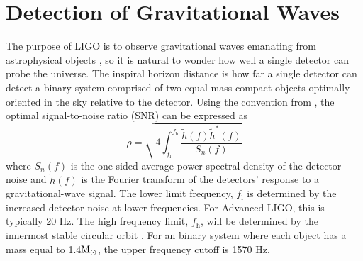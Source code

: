	\section{Detection of Gravitational Waves}\label{detectgw}
	The purpose of LIGO is to observe gravitational waves emanating from astrophysical objects \cite{NSFproposal}, so it is natural to wonder how well a single detector can probe the universe.  The inspiral horizon distance is how far a single detector can detect a binary system comprised of two equal mass compact objects optimally oriented in the sky relative to the detector.  Using the convention from \cite{S6sensitivity}, the optimal signal-to-noise ratio (SNR) can be expressed as
	\begin{equation}\label{SNR}
	\rho = \sqrt{4 \int_{f_{\text{l}}}^{f_\text{h}} \frac{ \tilde{h}(f) \tilde{h}^*(f) }{S_n(f)}}
	\end{equation}
	where ${S_n(f)}$ is the one-sided average power spectral density of the detector noise and $\tilde{h}(f)$ is the Fourier transform of the detectors' response to a gravitational-wave signal.  The lower limit frequency, $f_{\text{l}}$ is determined by the increased detector noise at lower frequencies.  For Advanced LIGO, this is typically 20 Hz.  The high frequency limit, $f_{\text{h}}$, will be determined by the innermost stable circular orbit \cite{Finn:1995}.  For an binary system where each object has a mass equal to 1.4$\textup{M}_\odot$, the upper frequency cutoff is 1570 Hz. 
	
